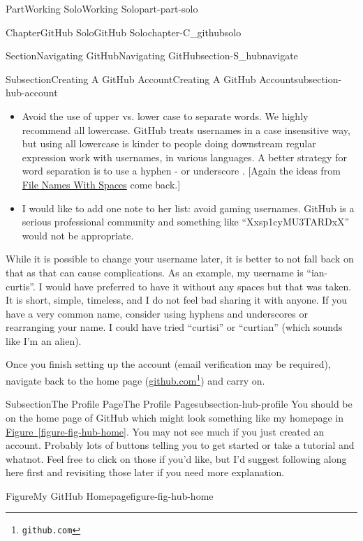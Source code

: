 \documentclass[oneside,10pt,]{book}
\newcommand{\xreffont}{\relax}
\begin{document}
\begin{partptx}{Part}{Working Solo}{}{Working Solo}{}{}{part-part-solo}
\begin{chapterptx}{Chapter}{GitHub Solo}{}{GitHub Solo}{}{}{chapter-C_githubsolo}
\begin{sectionptx}{Section}{Navigating GitHub}{}{Navigating GitHub}{}{}{section-S_hubnavigate}
\begin{subsectionptx}{Subsection}{Creating A GitHub Account}{}{Creating A GitHub Account}{}{}{subsection-hub-account}
\begin{enumerate}
\begin{itemize}[label=\textbullet]
\item{}Avoid the use of upper vs. lower case to separate words. We highly recommend all lowercase. GitHub treats usernames in a case insensitive way, but using all lowercase is kinder to people doing downstream regular expression work with usernames, in various languages. A better strategy for word separation is to use a hyphen - or underscore \textunderscore{}. [Again the ideas from \hyperlink{paragraphs-namesspaces}{File Names With Spaces} come back.]%
\item{}I would like to add one note to her list: avoid gaming usernames. GitHub is a serious professional community and something like ``Xx\textunderscore{}sp1cyMU3TARD\textunderscore{}xX'' would not be appropriate.%
\end{itemize}
While it is possible to change your username later, it is better to not fall back on that as that can cause complications. As an example, my username is ``ian-curtis''. I would have preferred to have it without any spaces but that was taken. It is short, simple, timeless, and I do not feel bad sharing it with anyone. If you have a very common name, consider using hyphens and underscores or rearranging your name. I could have tried ``curtisi'' or ``curtian'' (which sounds like I'm an alien).%
\end{enumerate}
%
\par
Once you finish setting up the account (email verification may be required), navigate back to the home page (\href{https://github.com}{github.com}\footnote{\nolinkurl{github.com}\label{fn-hub-account-f-b}}) and carry on.%
\end{subsectionptx}
%
%
\typeout{************************************************}
\typeout{************************************************}
%
\begin{subsectionptx}{Subsection}{The Profile Page}{}{The Profile Page}{}{}{subsection-hub-profile}
%
%
%
%
%
You should be on the home page of GitHub which might look something like my homepage in \hyperref[figure-fig-hub-home]{Figure~{\xreffont\ref{figure-fig-hub-home}}}. You may not see much if you just created an account. Probably lots of buttons telling you to get started or take a tutorial and whatnot. Feel free to click on those if you'd like, but I'd suggest following along here first and revisiting those later if you need more explanation.%
\begin{figureptx}{Figure}{My GitHub Homepage}{figure-fig-hub-home}{}%

\end{figureptx}
\end{subsectionptx}
\end{sectionptx}
\end{chapterptx}
\end{partptx}
\end{document}

